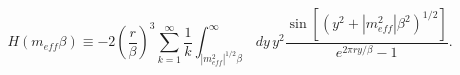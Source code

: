 \begin{equation}
H\left(m_{eff}\beta \right)\equiv -2\left(\frac{r}{\beta }\right)^{3}\sum _{k=1}^{\infty }\frac{1}{k}\int _{\left|m_{eff}^{2}\right|^{1/2}\beta }^{\infty }\, dy\, y^{2}\frac{\sin \left[\left(y^{2}+\left|m_{eff}^{2}\right|\beta ^{2}\right)^{1/2}\right]}{e^{2\pi ry/\beta }-1}.\end{equation}

